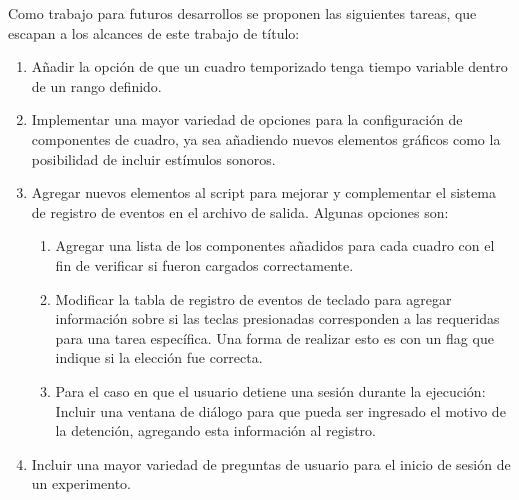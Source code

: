 \documentclass[\main/main.tex]{subfiles}
\begin{document}
		Como trabajo para futuros desarrollos se proponen las siguientes tareas, que escapan a los alcances de este trabajo de título:
		\begin{enumerate}\setlength\itemsep{-0.2em}
			\item Añadir la opción de que un cuadro temporizado tenga tiempo variable dentro de un rango definido.

			\item Implementar una mayor variedad de opciones para la configuración de componentes de cuadro, ya sea añadiendo nuevos elementos gráficos como la posibilidad de incluir estímulos sonoros.  

			\item Agregar nuevos elementos al script para mejorar y complementar el sistema de registro de eventos en el archivo de salida. Algunas opciones son:
				\begin{enumerate}\setlength\itemsep{-0.2em}
					\item Agregar una lista de los componentes añadidos para cada cuadro con el fin de verificar si fueron cargados correctamente.

					\item Modificar la tabla de registro de eventos de teclado para agregar información sobre si las teclas presionadas corresponden a las requeridas para una tarea específica. Una forma de realizar esto es con un flag que indique si la elección fue correcta. 

					\item Para el caso en que el usuario detiene una sesión durante la ejecución: Incluir una ventana de diálogo para que pueda ser ingresado el motivo de la detención, agregando esta información al registro. 

				\end{enumerate}

			\item Incluir una mayor variedad de preguntas de usuario para el inicio de sesión de un experimento. 

		\end{enumerate}
	
\end{document}
